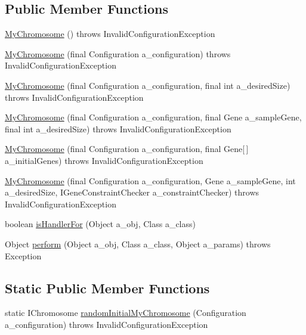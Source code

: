 \subsection*{Public Member Functions}
\begin{DoxyCompactItemize}
\item 
\hyperlink{classexamples_1_1distinct_genes_1_1_my_chromosome_a24c6ed524778f8e561551fe57caf5e34}{My\-Chromosome} ()  throws Invalid\-Configuration\-Exception 
\item 
\hyperlink{classexamples_1_1distinct_genes_1_1_my_chromosome_aed3c2d762ea5391bcdb20662a28b4051}{My\-Chromosome} (final Configuration a\-\_\-configuration)  throws Invalid\-Configuration\-Exception 
\item 
\hyperlink{classexamples_1_1distinct_genes_1_1_my_chromosome_afbd0fc1b7444a25ca0a6975ddf75abac}{My\-Chromosome} (final Configuration a\-\_\-configuration, final int a\-\_\-desired\-Size)  throws Invalid\-Configuration\-Exception 
\item 
\hyperlink{classexamples_1_1distinct_genes_1_1_my_chromosome_a00cdd847a7c875fc81d39992f55fb963}{My\-Chromosome} (final Configuration a\-\_\-configuration, final Gene a\-\_\-sample\-Gene, final int a\-\_\-desired\-Size)  throws Invalid\-Configuration\-Exception 
\item 
\hyperlink{classexamples_1_1distinct_genes_1_1_my_chromosome_afcca41f66f1c972899e21c1b604685f3}{My\-Chromosome} (final Configuration a\-\_\-configuration, final Gene\mbox{[}$\,$\mbox{]} a\-\_\-initial\-Genes)  throws Invalid\-Configuration\-Exception 
\item 
\hyperlink{classexamples_1_1distinct_genes_1_1_my_chromosome_ae66fee073b59928b18d49cb5886a644b}{My\-Chromosome} (final Configuration a\-\_\-configuration, Gene a\-\_\-sample\-Gene, int a\-\_\-desired\-Size, I\-Gene\-Constraint\-Checker a\-\_\-constraint\-Checker)  throws Invalid\-Configuration\-Exception 
\item 
boolean \hyperlink{classexamples_1_1distinct_genes_1_1_my_chromosome_a99422b25d88c410e715ba97a461d16aa}{is\-Handler\-For} (Object a\-\_\-obj, Class a\-\_\-class)
\item 
Object \hyperlink{classexamples_1_1distinct_genes_1_1_my_chromosome_a032aa2bcb4088f55d3e271ea9bb73be1}{perform} (Object a\-\_\-obj, Class a\-\_\-class, Object a\-\_\-params)  throws Exception 
\end{DoxyCompactItemize}
\subsection*{Static Public Member Functions}
\begin{DoxyCompactItemize}
\item 
static I\-Chromosome \hyperlink{classexamples_1_1distinct_genes_1_1_my_chromosome_a44c2cc5aba20f5266ae898e26bac6087}{random\-Initial\-My\-Chromosome} (Configuration a\-\_\-configuration)  throws Invalid\-Configuration\-Exception 
\end{DoxyCompactItemize}

